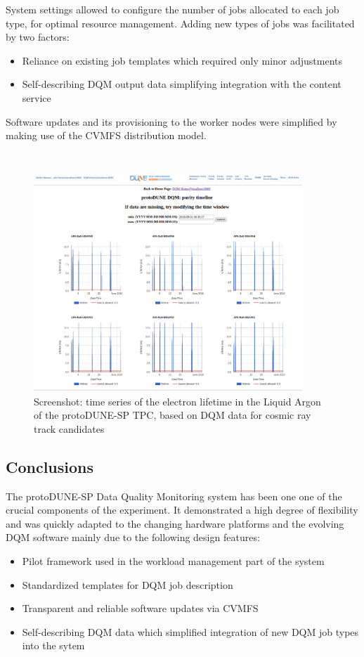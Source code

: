 \documentclass{webofc}
\newcommand{\pd}{protoDUNE\xspace}
\begin{document}
\noindent System settings allowed to configure the number of jobs allocated to each job type,
for optimal resource management. Adding new types of jobs was facilitated by two factors:

\begin{itemize}

\item Reliance on existing job templates which required only minor adjustments

\item Self-describing DQM output data simplifying integration with the content service \cite{chep18}

\end{itemize}

\noindent Software updates and its provisioning to the worker nodes were simplified by making use of
the CVMFS distribution model.

\ 

\begin{figure}[h]
\centering
\includegraphics[width=0.9\textwidth,clip]{figures/purity2019.png}
\caption{Screenshot: time series of the electron lifetime in the Liquid Argon of the protoDUNE-SP TPC, based on
DQM data for cosmic ray track candidates}
\label{fig:purity}
\end{figure}

\subsection{Conclusions}

The \pd-SP Data Quality Monitoring system has been one one of the crucial components of the experiment.
It demonstrated a high degree of flexibility and was quickly adapted to the changing hardware platforms and
the evolving DQM software mainly due to the following design features:
\begin{itemize}
\item Pilot framework used in the workload management part of the system
\item Standardized templates for DQM job description
\item Transparent and reliable software updates via CVMFS
\item Self-describing DQM data which simplified integration of new DQM job types into the sytem
\end{itemize}
\end{document}
